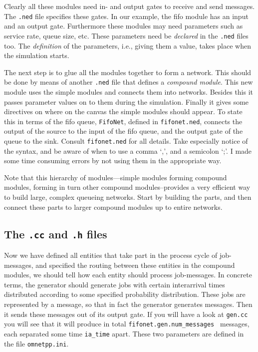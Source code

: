 \documentclass[a4paper]{article}
\begin{document}
Clearly all these modules need in- and output gates to receive and
send messages. The \texttt{.ned} file specifies these gates. In our
example, the fifo module has an input and an output gate. Furthermore
these modules may need parameters such as service rate, queue size,
etc. These parameters need be \emph{declared}  in the \texttt{.ned} files
too. The \emph{definition} of the parameters, i.e., giving them a
value, takes place when the simulation starts.

The next step is to glue all the modules together to form a network.
This should be done by means of another \texttt{.ned} file that
defines a \emph{compound module}. This new module uses the simple
modules and connects them into networks. Besides this it passes
parameter values on to them during the simulation. Finally it gives
some directives on where on the canvas the simple modules should
appear. To state this in terms of the fifo queue, \texttt{FifoNet},
defined in \texttt{fifonet.ned}, connects the output of the source to
the input of the fifo queue, and the output gate of the queue to the
sink. Consult \texttt{fifonet.ned} for all details. Take especially
notice of the syntax, and be aware of when to use a comma `,', and a
semicolon `;'. I made some time consuming errors by not using them in
the appropriate way.

Note that this hierarchy of
modules---simple modules forming compound modules, forming in turn
other compound modules--provides a very efficient way to build large,
complex queueing networks. Start by building the parts, and then
connect these parts to larger compound modules up to entire networks.

\subsection{The \texttt{.cc} and \texttt{.h} files}
\label{sec:texttt.cc-texttt.h-f}
Now we have defined all entities that take part in the process cycle
of job-messages, and specified the routing between these entities in
the compound modules, we should tell how each entity should process
job-messages. In concrete terms, the generator should generate jobs
with certain interarrival times distributed according to some
specified probability distribution. These jobs are represented by a
message, so that in fact the generator generates messages. Then it
sends these messages out of its output gate. If you will have a look
at \texttt{gen.cc} you will see that it will produce in total
\texttt{fifonet.gen.num\_messages } messages, each separated some time
\texttt{ia\_time} apart. These two parameters are defined in the file
\texttt{omnetpp.ini}.
\end{document}
